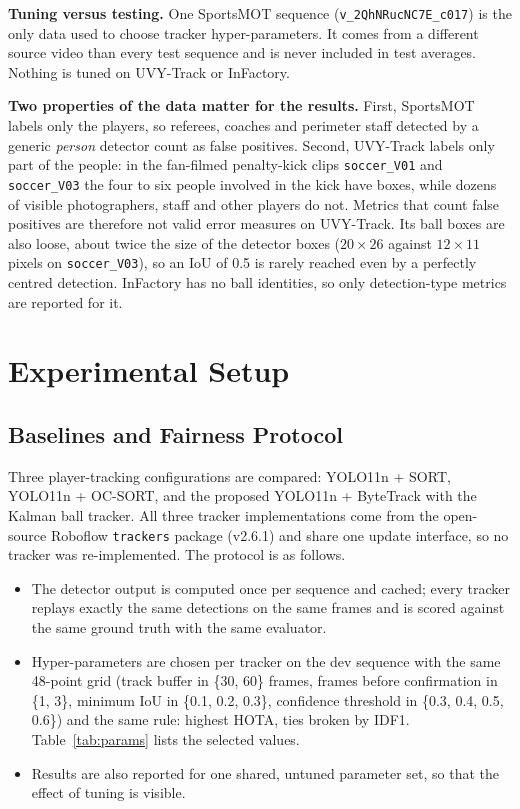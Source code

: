 \documentclass[conference]{IEEEtran}
\begin{document}
\textbf{Tuning versus testing.} One SportsMOT sequence
(\texttt{v\_2QhNRucNC7E\_c017}) is the only data used to choose tracker
hyper-parameters. It comes from a different source video than every test sequence
and is never included in test averages. Nothing is tuned on UVY-Track or
InFactory.

\textbf{Two properties of the data matter for the results.} First, SportsMOT
labels only the players, so referees, coaches and perimeter staff detected by a
generic \emph{person} detector count as false positives. Second, UVY-Track labels
only part of the people: in the fan-filmed penalty-kick clips \texttt{soccer\_V01}
and \texttt{soccer\_V03} the four to six people involved in the kick have boxes,
while dozens of visible photographers, staff and other players do not. Metrics
that count false positives are therefore not valid error measures on UVY-Track.
Its ball boxes are also loose, about twice the size of the detector boxes
($20\times26$ against $12\times11$ pixels on \texttt{soccer\_V03}), so an IoU of
0.5 is rarely reached even by a perfectly centred detection. InFactory has no ball
identities, so only detection-type metrics are reported for it.

\section{Experimental Setup}
\subsection{Baselines and Fairness Protocol}
Three player-tracking configurations are compared: YOLO11n + SORT, YOLO11n +
OC-SORT, and the proposed YOLO11n + ByteTrack with the Kalman ball tracker. All
three tracker implementations come from the open-source Roboflow
\texttt{trackers} package (v2.6.1) and share one update interface, so no tracker was
re-implemented. The protocol is as follows.
\begin{itemize}
\item The detector output is computed once per sequence and cached; every
tracker replays exactly the same detections on the same frames and is scored
against the same ground truth with the same evaluator.
\item Hyper-parameters are chosen per tracker on the dev sequence with the same
48-point grid (track buffer in \{30, 60\} frames, frames before confirmation in
\{1, 3\}, minimum IoU in \{0.1, 0.2, 0.3\}, confidence threshold in
\{0.3, 0.4, 0.5, 0.6\}) and the same rule: highest HOTA, ties broken by IDF1.
Table~\ref{tab:params} lists the selected values.
\item Results are also reported for one shared, untuned parameter set, so that
the effect of tuning is visible.
\end{itemize}
\end{document}
